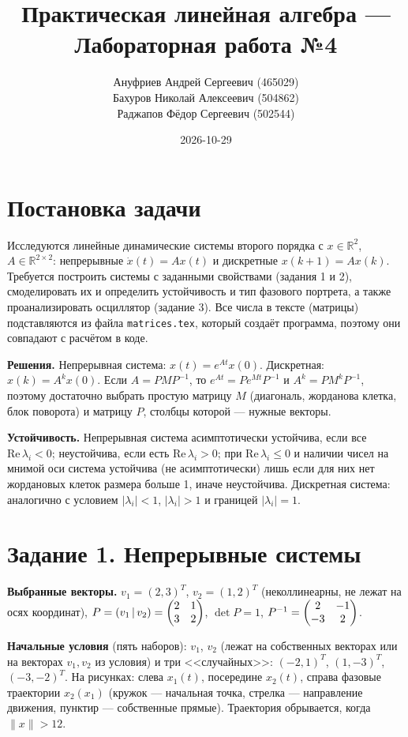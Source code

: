 \documentclass[a4paper, 12pt]{article}
\title{
    Практическая линейная алгебра — Лабораторная работа №4
}
\author{%
    Ануфриев Андрей Сергеевич (465029)\\
    Бахуров Николай Алексеевич (504862)\\
    Раджапов Фёдор Сергеевич (502544)%
}
\date{2026-10-29}
\begin{document}
    \maketitle
    \tableofcontents
    \newpage

    \section{Постановка задачи}
    Исследуются линейные динамические системы второго порядка с $x\in\mathbb R^2$, $A\in\mathbb R^{2\times2}$: непрерывные $\dot x(t)=Ax(t)$ и дискретные $x(k+1)=Ax(k)$. Требуется построить системы с заданными свойствами (задания 1 и 2), смоделировать их и определить устойчивость и тип фазового портрета, а также проанализировать осциллятор (задание 3). Все числа в тексте (матрицы) подставляются из файла \texttt{matrices.tex}, который создаёт программа, поэтому они совпадают с расчётом в коде.

    \textbf{Решения.} Непрерывная система: $x(t)=e^{At}x(0)$. Дискретная: $x(k)=A^kx(0)$. Если $A=PMP^{-1}$, то $e^{At}=Pe^{Mt}P^{-1}$ и $A^k=PM^kP^{-1}$, поэтому достаточно выбрать простую матрицу $M$ (диагональ, жорданова клетка, блок поворота) и матрицу $P$, столбцы которой --- нужные векторы.

    \textbf{Устойчивость.} Непрерывная система асимптотически устойчива, если все $\mathrm{Re}\,\lambda_i<0$; неустойчива, если есть $\mathrm{Re}\,\lambda_i>0$; при $\mathrm{Re}\,\lambda_i\le0$ и наличии чисел на мнимой оси система устойчива (не асимптотически) лишь если для них нет жордановых клеток размера больше 1, иначе неустойчива. Дискретная система: аналогично с условием $|\lambda_i|<1$, $|\lambda_i|>1$ и границей $|\lambda_i|=1$.

    \section{Задание 1. Непрерывные системы}
    \textbf{Выбранные векторы.} $v_1=(2,3)^T$, $v_2=(1,2)^T$ (неколлинеарны, не лежат на осях координат), $P=(v_1\,|\,v_2)=\begin{pmatrix}2 & 1 \\ 3 & 2\end{pmatrix}$, $\det P=1$, $P^{-1}=\begin{pmatrix}2 & -1 \\ -3 & 2\end{pmatrix}$.

    \textbf{Начальные условия} (пять наборов): $v_1$, $v_2$ (лежат на собственных векторах или на векторах $v_1,v_2$ из условия) и три <<случайных>>: $(-2,1)^T$, $(1,-3)^T$, $(-3,-2)^T$. На рисунках: слева $x_1(t)$, посередине $x_2(t)$, справа фазовые траектории $x_2(x_1)$ (кружок --- начальная точка, стрелка --- направление движения, пунктир --- собственные прямые). Траектория обрывается, когда $\|x\|>12$.
\end{document}

